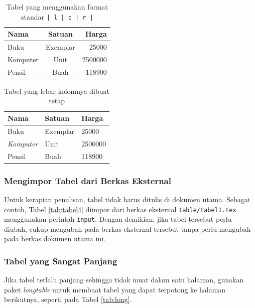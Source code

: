 \begin{table}[t] %
  \caption{Tabel yang menggunakan format standar \texttt{| l | c | r |}}
  \label{tab:tabel2}
	\begin{tabular}{ | l | c | r | }
	\hline
	Nama 	& Satuan 		& Harga \\
	\hline
	Buku 	& Exemplar	& 25000 \\
	Komputer	& Unit		& 2500000 \\
	Pensil	& Buah		& 118900 \\
	\hline
	\end{tabular}
\end{table}


\begin{table}[t] %
  \centering
  \caption{Tabel yang lebar kolomnya dibuat tetap}
  \label{tbl:tabel3}
	\begin{tabular}{  p{} | p{} | p{}  }
	\hline
	\textbf{Nama} 	& \textbf{Satuan} 		& \textbf{Harga} \\
	\hline
	Buku 	& Exemplar	& 25000 \\
	\emph{Komputer}	& Unit		& 2500000 \\
	Pensil	& Buah		& 118900 \\
	\hline
	\end{tabular}
\end{table}

\subsubsection{Mengimpor Tabel dari Berkas Eksternal}

Untuk kerapian penulisan, tabel tidak harus ditulis di dokumen utama. Sebagai contoh, Tabel \ref{tab:tabel4} diimpor dari berkas eksternal \texttt{table/tabel1.tex} menggunakan perintah \texttt{input}. 
Dengan demikian, jika tabel tersebut perlu diubah, cukup mengubah pada berkas eksternal tersebut tanpa perlu mengubah pada berkas dokumen utama ini.




\subsubsection{Tabel yang Sangat Panjang}
Jika tabel terlalu panjang sehingga tidak muat dalam satu halaman, gunakan paket 
\textit{longtable} untuk membuat tabel yang dapat terpotong ke halaman berikutnya, 
seperti pada Tabel \ref{tab:long}. 

